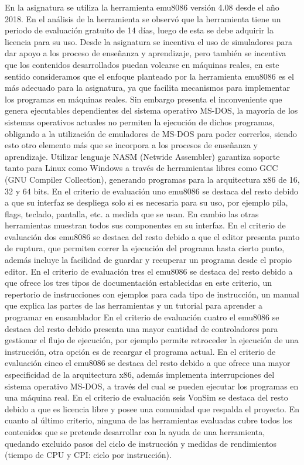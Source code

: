 \documentclass[12pt,twoside]{templates/unerthesis}
\begin{document}
En la asignatura se utiliza la herramienta emu8086 versión 4.08 desde el año 2018. En el análisis de la herramienta se observó que la herramienta tiene un periodo de evaluación gratuito de 14 días, luego de esta se debe adquirir la licencia para su uso.
Desde la asignatura se incentiva el uso de simuladores para dar apoyo a los proceso de enseñanza y aprendizaje, pero también se incentiva que los contenidos desarrollados puedan volcarse en máquinas reales, en este sentido consideramos que el enfoque planteado por la herramienta emu8086 es el más adecuado para la asignatura, ya que facilita mecanismos para implementar los programas en máquinas reales. Sin embargo presenta el inconveniente que genera ejecutables dependientes del sistema operativo MS-DOS, la mayoría de los sistemas operativos actuales no permiten la ejecución de dichos programas, obligando a la utilización de emuladores de MS-DOS para poder correrlos, siendo esto otro elemento más que se incorpora a los procesos de enseñanza y aprendizaje.
Utilizar lenguaje NASM (Netwide Assembler) garantiza soporte tanto para Linux como Windows a través de herramientas libres como GCC (GNU Compiler Collection), generando programas para la arquitectura x86 de 16, 32 y 64 bits.
En el criterio de evaluación uno emu8086 se destaca del resto debido a que su interfaz se despliega solo si es necesaria para su uso, por ejemplo pila, flags, teclado, pantalla, etc. a medida que se usan. En cambio las otras herramientas muestran todos sus componentes en su interfaz.
En el criterio de evaluación dos emu8086 se destaca del resto debido a que el editor presenta punto de ruptura, que permiten correr la ejecución del programa hasta cierto punto, además incluye la facilidad de guardar y recuperar un programa desde el propio editor.
En el criterio de evaluación tres el emu8086 se destaca del resto debido a que ofrece los tres tipos de documentación establecidas en este criterio, un repertorio de instrucciones con ejemplos para cada tipo de instrucción, un manual que explica las partes de las herramientas y un tutorial para aprender a programar en ensamblador
En el criterio de evaluación cuatro el emu8086 se destaca del resto debido presenta una mayor cantidad de controladores para gestionar el flujo de ejecución, por ejemplo permite retroceder la ejecución de una instrucción, otra opción es de recargar el programa actual.
En el criterio de evaluación cinco el emu8086 se destaca del resto debido a que ofrece una mayor especificidad de la arquitectura x86, además implementa interrupciones del sistema operativo MS-DOS, a través del cual se pueden ejecutar los programas en una máquina real.
En el criterio de evaluación seis VonSim se destaca del resto debido a que es licencia libre y posee una comunidad que respalda el proyecto.
En cuanto al último criterio, ninguna de las herramientas evaluadas cubre todos los contenidos que se pretende desarrollar con la ayuda de una herramienta, quedando excluido pasos del ciclo de instrucción y medidas de rendimientos (tiempo de CPU y CPI: ciclo por instrucción).
\end{document}
